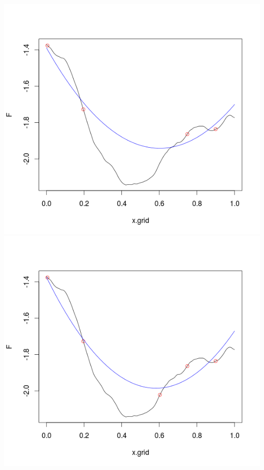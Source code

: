 \begin{frame}
\includegraphics[trim = 10mm 20mm 10mm 10mm, clip, width=.37\paperwidth]{fig/prs1.png}
\includegraphics[trim = 10mm 20mm 10mm 10mm, clip, width=.37\paperwidth]{fig/prs2.png}
\end{frame}

